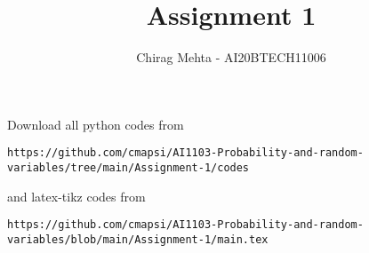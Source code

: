\documentclass[journal,12pt,twocolumn]{IEEEtran}
\DeclareMathOperator*{\Res}{Res}
\begin{document}
\newcommand{\BEQA}{\begin{eqnarray}}
\newcommand{\EEQA}{\end{eqnarray}}
\newcommand{\define}{\stackrel{\triangle}{=}}

\raggedbottom
\setlength{\parindent}{0pt}
\providecommand{\mbf}{\mathbf}
\providecommand{\pr}[1]{\ensuremath{\Pr\left(#1\right)}}
\providecommand{\qfunc}[1]{\ensuremath{Q\left(#1\right)}}
\providecommand{\sbrak}[1]{\ensuremath{{}\left[#1\right]}}
\providecommand{\lsbrak}[1]{\ensuremath{{}\left[#1\right.}}
\providecommand{\rsbrak}[1]{\ensuremath{{}\left.#1\right]}}
\providecommand{\brak}[1]{\ensuremath{\left(#1\right)}}
\providecommand{\lbrak}[1]{\ensuremath{\left(#1\right.}}
\providecommand{\rbrak}[1]{\ensuremath{\left.#1\right)}}
\providecommand{\cbrak}[1]{\ensuremath{\left\{#1\right\}}}
\providecommand{\lcbrak}[1]{\ensuremath{\left\{#1\right.}}
\providecommand{\rcbrak}[1]{\ensuremath{\left.#1\right\}}}
\theoremstyle{remark}
\newtheorem{rem}{Remark}
\newcommand{\sgn}{\mathop{\mathrm{sgn}}}
\providecommand{\abs}[1]{\vert#1\vert}
\providecommand{\res}[1]{\Res\displaylimits_{#1}} 
\providecommand{\norm}[1]{\lVert#1\rVert}
\providecommand{\mtx}[1]{\mathbf{#1}}
\providecommand{\mean}[1]{E[ #1 ]}
\providecommand{\fourier}{\overset{\mathcal{F}}{ \rightleftharpoons}}
\providecommand{\system}{\overset{\mathcal{H}}{ \longleftrightarrow}}
\newcommand{\solution}{\noindent \textbf{Solution: }}
\newcommand{\cosec}{\,\text{cosec}\,}
\providecommand{\dec}[2]{\ensuremath{\overset{#1}{\underset{#2}{\gtrless}}}}
\newcommand{\myvec}[1]{\ensuremath{\begin{pmatrix}#1\end{pmatrix}}}
\newcommand{\mydet}[1]{\ensuremath{\begin{vmatrix}#1\end{vmatrix}}}
\makeatletter
{}
\makeatother
\let\StandardTheFigure\thefigure
\let\vec\mathbf
\renewcommand{\thefigure}{\theproblem}
\def\putbox#1#2#3{\makebox[0in][l]{\makebox[#1][l]{}\raisebox{\baselineskip}[0in][0in]{\raisebox{#2}[0in][0in]{#3}}}}
     \def\rightbox#1{\makebox[0in][r]{#1}}
     \def\centbox#1{\makebox[0in]{#1}}
     \def\topbox#1{\raisebox{-\baselineskip}[0in][0in]{#1}}
     \def\midbox#1{\raisebox{-0.5\baselineskip}[0in][0in]{#1}}
\vspace{3cm}
\title{Assignment 1}
\author{Chirag Mehta - AI20BTECH11006}
\maketitle
\newpage
\bigskip
\renewcommand{\thefigure}{\theenumi}
\renewcommand{\thetable}{\theenumi}
Download all python codes from 
\begin{lstlisting}
https://github.com/cmapsi/AI1103-Probability-and-random-variables/tree/main/Assignment-1/codes
\end{lstlisting}
and latex-tikz codes from 
\begin{lstlisting}
https://github.com/cmapsi/AI1103-Probability-and-random-variables/blob/main/Assignment-1/main.tex
\end{lstlisting}
\end{document}
